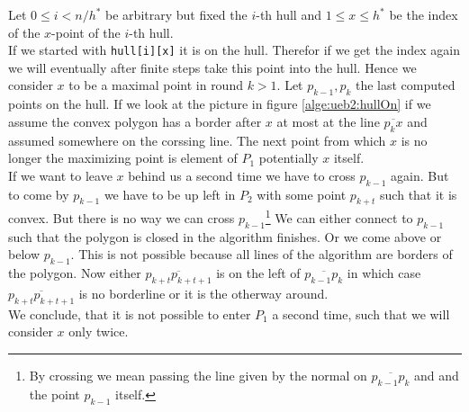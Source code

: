 \documentclass[11pt,a4paper,ngerman]{article}
\begin{document}
\begin{description}
\begin{enumerate}[a)]
        Let $0 \leq i < n / h^*$ be arbitrary but fixed the $i$-th hull and
        $1 \leq x \leq h^*$ be the index of the $x$-point of the $i$-th hull.\\

        If we started with \lstinline|hull[i][x]| it is on the hull. Therefor
        if we get the index again we will eventually after finite steps
        take this point into the hull. Hence we consider $x$ to be a maximal
        point in round $k > 1$. Let $p_{k-1}, p_k$ the last computed points
        on the hull.
        If we look at the picture in figure \ref{alge:ueb2:hullOn}
        if we assume the convex polygon has a border after $x$ at most 
        at the line $\overline{p_kx}$ and assumed somewhere on the corssing line.
        The next point from which $x$ is no longer the maximizing point is
        element of $P_1$ potentially $x$ itself.\\
        If we want to leave $x$ behind us a second time we have to cross $p_{k-1}$
        again. But to come by $p_{k-1}$ we have to be up left in $P_2$ with some
        point $p_{k+t}$ such that it is convex. But there is no way we can
        cross $p_{k-1}$\footnote{By crossing we mean passing the line given
        by the normal on $\overline{p_{k-1}p_k}$ and and the point $p_{k-1}$ itself.}
        We can either connect to $p_{k-1}$ such that the polygon is closed in the
        algorithm finishes. Or we come above or below $p_{k-1}$.
        This is not possible because all lines of the algorithm are borders
        of the polygon. Now either $\overline{p_{k+t}p_{k+t+1}}$ is on the left
        of $\overline{p_{k-1}p_k}$ in which case $\overline{p_{k+t}p_{k+t+1}}$ is
        no borderline or it is the otherway around.\\

        We conclude, that it is not possible to enter $P_1$ a second time,
        such that we will consider $x$ only twice.\\


\end{enumerate}
\end{description}
\end{document}
